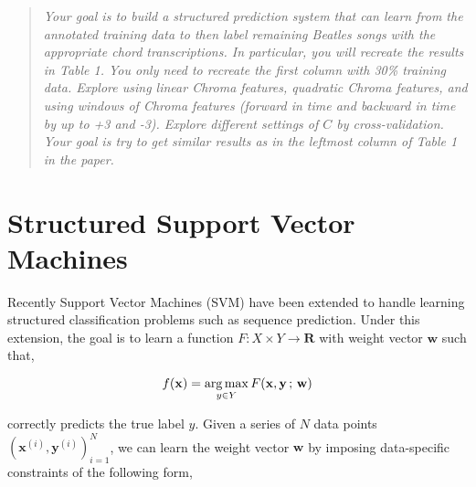 \newcommand{\proj}[1]{\ensuremath{\operatorname{Project}\paren{{#1}}}}
\newcommand{\Proj}{\operatorname{Project}}

\newcommand{\Regret}{\operatorname{Regret}}






\begin{abstract} \emph{Your goal is to build a structured prediction system that can
learn from the annotated training data to then label remaining Beatles songs
with the appropriate chord transcriptions. In particular, you will recreate the
results in Table 1. You only need to recreate the first column with 30\%
training data.  Explore using linear Chroma features, quadratic Chroma
features, and using windows of Chroma features (forward in time and backward in
time by up to +3 and -3). Explore different settings of $C$ by
cross-validation.  Your goal is try to get similar results as in the leftmost
column of Table 1 in the paper.}  \end{abstract}

\section{Structured Support Vector Machines}
\label{sec:struct-svm}

Recently Support Vector Machines (SVM) have been extended to handle learning
structured classification problems such as sequence prediction. Under this
extension, the goal is to learn a function $F : X \times Y \rightarrow
\mathbf{R}$ with weight vector $\mathbf{w}$ such that,

\begin{equation*}
f(\mathbf{x}) = \operatorname*{arg\,max}_{y \in Y}F(\mathbf{x},\mathbf{y}\,;\,\mathbf{w})
\end{equation*}

correctly predicts the true label $y$. Given a series of $N$ data points
$(\mathbf{x}^{(i)}, \mathbf{y}^{(i)})_{i=1}^{N}$, we can learn the weight
vector $\mathbf{w}$ by imposing data-specific constraints of the following
form,

